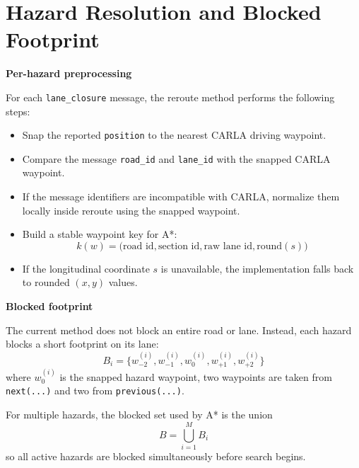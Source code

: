 \documentclass[11pt]{article}
\begin{document}
\section*{Hazard Resolution and Blocked Footprint}
\begin{minipage}[t]{0.59\textwidth}
\textbf{Per-hazard preprocessing}

For each \texttt{lane\_closure} message, the reroute method performs the following steps:
\begin{itemize}
\setlength\itemsep{0.3em}
\item Snap the reported \texttt{position} to the nearest CARLA driving waypoint.
\item Compare the message \texttt{road\_id} and \texttt{lane\_id} with the snapped CARLA waypoint.
\item If the message identifiers are incompatible with CARLA, normalize them locally inside reroute using the snapped waypoint.
\item Build a stable waypoint key for A*:
\[
k(w)=\bigl(\text{road id},\text{section id},\text{raw lane id},\mathrm{round}(s)\bigr)
\]
\item If the longitudinal coordinate \(s\) is unavailable, the implementation falls back to rounded \((x,y)\) values.
\end{itemize}

\textbf{Blocked footprint}

The current method does not block an entire road or lane. Instead, each hazard blocks a short footprint on its lane:
\[
B_i=\{w^{(i)}_{-2},w^{(i)}_{-1},w^{(i)}_0,w^{(i)}_{+1},w^{(i)}_{+2}\}
\]
where \(w^{(i)}_0\) is the snapped hazard waypoint, two waypoints are taken from \texttt{next(...)} and two from \texttt{previous(...)}.

For multiple hazards, the blocked set used by A* is the union
\[
B=\bigcup_{i=1}^{M} B_i
\]
so all active hazards are blocked simultaneously before search begins.
\end{minipage}
\hfill
\end{document}
